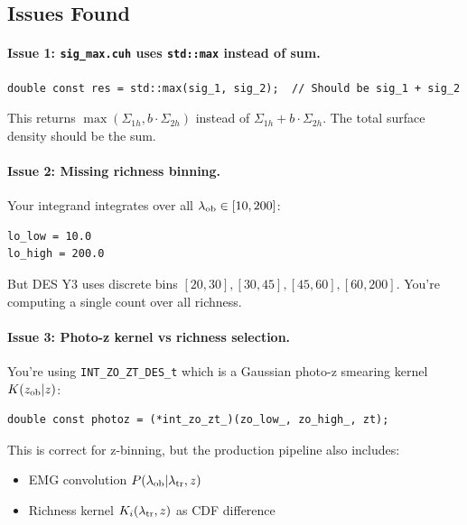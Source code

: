 \documentclass[a4paper, 11pt]{article}
\newcommand{\filepath}[1]{{\small\texttt{#1}}}
\begin{document}
\subsection{Issues Found}

\paragraph{Issue 1: \texttt{sig\_max.cuh} uses \texttt{std::max} instead of sum.}

\begin{lstlisting}[title={\filepath{src/models/sig\_max.cuh:67}}]
double const res = std::max(sig_1, sig_2);  // Should be sig_1 + sig_2
\end{lstlisting}

This returns $\max(\Sigma_{1h}, b \cdot \Sigma_{2h})$ instead of $\Sigma_{1h} + b \cdot \Sigma_{2h}$. The total surface density should be the sum.

\paragraph{Issue 2: Missing richness binning.}
Your integrand integrates over all $\lambda_{\rm ob} \in [10, 200]$:

\begin{lstlisting}[language=bash]
lo_low = 10.0
lo_high = 200.0
\end{lstlisting}

But DES Y3 uses discrete bins $[20,30], [30,45], [45,60], [60,200]$. You're computing a single count over all richness.

\paragraph{Issue 3: Photo-z kernel vs richness selection.}
You're using \texttt{INT\_ZO\_ZT\_DES\_t} which is a Gaussian photo-z smearing kernel $K(z_{\rm ob}|z)$:

\begin{lstlisting}
double const photoz = (*int_zo_zt_)(zo_low_, zo_high_, zt);
\end{lstlisting}

This is correct for z-binning, but the production pipeline also includes:
\begin{itemize}
  \setlength\itemsep{2pt}
  \item EMG convolution $P(\lambda_{\rm ob}|\lambda_{\rm tr},z)$
  \item Richness kernel $K_i(\lambda_{\rm tr},z)$ as CDF difference
\end{itemize}
\end{document}
